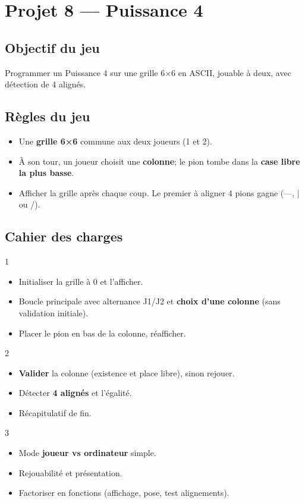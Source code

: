 \section{Projet 8 — Puissance 4}

\subsection*{Objectif du jeu}
Programmer un Puissance 4 sur une grille 6×6 en ASCII, jouable à deux, avec détection de 4 alignés.

\subsection*{Règles du jeu}
\begin{itemize}
  \item Une \textbf{grille 6×6} commune aux deux joueurs (1 et 2).
  \item À son tour, un joueur choisit une \textbf{colonne}; le pion tombe dans la \textbf{case libre la plus basse}.
  \item Afficher la grille après chaque coup. Le premier à aligner 4 pions gagne (—, | ou /).
\end{itemize}

\subsection*{Cahier des charges}
\begin{UPSTICahierDesCharges}{1}
\begin{itemize}
  \item Initialiser la grille à 0 et l’afficher.
  \item Boucle principale avec alternance J1/J2 et \textbf{choix d’une colonne} (sans validation initiale).
  \item Placer le pion en bas de la colonne, réafficher.
\end{itemize}
\end{UPSTICahierDesCharges}

\begin{UPSTICahierDesCharges}{2}
\begin{itemize}
  \item \textbf{Valider} la colonne (existence et place libre), sinon rejouer.
  \item Détecter \textbf{4 alignés} et l’égalité.
  \item Récapitulatif de fin.
\end{itemize}
\end{UPSTICahierDesCharges}

\begin{UPSTICahierDesCharges}{3}
\begin{itemize}
  \item Mode \textbf{joueur vs ordinateur} simple.
  \item Rejouabilité et présentation.
  \item Factoriser en fonctions (affichage, pose, test alignements).
\end{itemize}
\end{UPSTICahierDesCharges}

